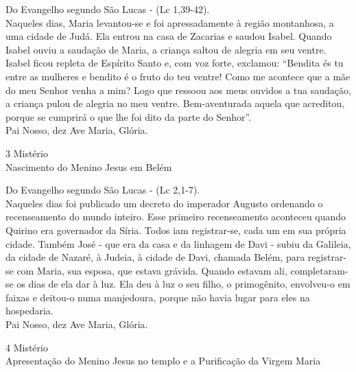 \begin{flushleft}
    Do Evangelho segundo São Lucas - (\textcolor{VioletRed2}{Lc 1,39-42}). \\
    \hfill{} \break{}
    Naqueles dias, Maria levantou-se e foi apressadamente à região montanhosa, a uma cidade de Judá. Ela entrou na casa de Zacarias e saudou Isabel. Quando Isabel ouviu a saudação de Maria, a criança saltou de alegria em seu ventre. Isabel ficou repleta de Espírito Santo e, com voz forte, exclamou: ``Bendita és tu entre as mulheres e bendito é o fruto do teu ventre! Como me acontece que a mãe do meu Senhor venha a mim? Logo que ressoou aos meus ouvidos a tua saudação, a criança pulou de alegria no meu ventre. Bem-aventurada aquela que acreditou, porque se cumprirá o que lhe foi dito da parte do Senhor''. \\
    \hfill{} \break{}
    Pai Nosso, dez Ave Maria, Glória.
\end{flushleft}
\begin{center}
    3\textordmasculine{} Mistério \\ Nascimento do Menino Jesus em Belém
\end{center}
\begin{flushleft}
    Do Evangelho segundo São Lucas - (\textcolor{VioletRed2}{Lc 2,1-7}). \\
    \hfill{} \break{}
    Naqueles dias foi publicado um decreto do imperador Augusto ordenando o recenseamento do mundo inteiro. Esse primeiro recenseamento aconteceu quando Quirino era governador da Síria. Todos iam registrar-se, cada um em sua própria cidade. Também José - que era da casa e da linhagem de Davi - subiu da Galileia, da cidade de Nazaré, à Judeia, à cidade de Davi, chamada Belém, para registrar-se com Maria, sua esposa, que estava grávida. Quando estavam ali, completaram-se os dias de ela dar à luz. Ela deu à luz o seu filho, o primogênito, envolveu-o em faixas e deitou-o numa manjedoura, porque não havia lugar para eles na hospedaria. \\
    \hfill{} \break{}
    Pai Nosso, dez Ave Maria, Glória.
\end{flushleft}
\newpage
\begin{center}
    4\textordmasculine{} Mistério \\ Apresentação do Menino Jesus no templo e a Purificação da Virgem Maria
\end{center}
